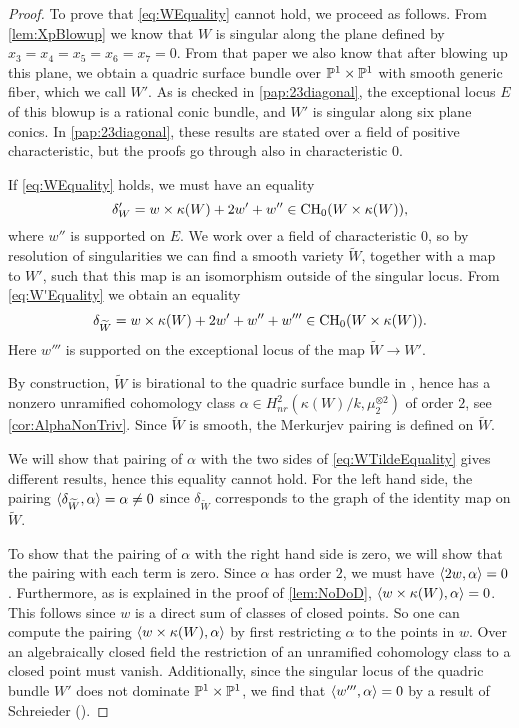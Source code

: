 \begin{proof}
To prove that \eqref{eq:WEquality} cannot hold, we proceed as follows. From \cref{lem:XpBlowup} we know that $W$ is singular along the plane defined by $x_3=x_4=x_5=x_6=x_7=0.$ From that paper we also know that after blowing up this plane, we obtain a quadric surface bundle over $\P^1 \times \P^1$ with smooth generic fiber, which we call $W'$. As is checked in \cref{pap:23diagonal}, the exceptional locus $E$ of this blowup is a rational conic bundle, and $W'$ is singular along six plane conics. In \cref{pap:23diagonal}, these results are stated over a field of positive characteristic, but the proofs go through also in characteristic $0$.

If \eqref{eq:WEquality} holds, we must have an equality 
\begin{equation}
	\label{eq:W'Equality}
	\delta_W' = w \times \kappa(W) + 2w' + w'' \in \CH_0(W \times \kappa(W)),
\end{equation}
where $w''$ is supported on $E$. We work over a field of characteristic $0$, so by resolution of singularities we can find a smooth variety $\widetilde{W}$, together with a map to $W'$, such that this map is an isomorphism outside of the singular locus. From \eqref{eq:W'Equality} we obtain an equality
\begin{equation}
	\label{eq:WTildeEquality}
	\delta_{\widetilde{W}} = w \times \kappa(W) + 2w' + w'' + w''' \in \CH_0(W \times \kappa(W)).
\end{equation}
Here $w'''$ is supported on the exceptional locus of the map $\widetilde{W} \to W'$.

By construction, $\widetilde{W}$ is birational to the quadric surface bundle in \cite{HPTActa}, hence has a nonzero unramified cohomology class $\alpha \in H_{nr}^2(\kappa(W)/k, \mu_2^{\otimes 2})$ of order $2$, see \cref{cor:AlphaNonTriv}. Since $\widetilde{W}$ is smooth, the Merkurjev pairing is defined on $\widetilde{W}$.

We will show that pairing of $\alpha$ with the two sides of \eqref{eq:WTildeEquality} gives different results, hence this equality cannot hold. For the left hand side, the pairing $\ip{\delta_{\widetilde{W}}, \alpha} = \alpha \neq 0$ since $\delta_{\widetilde{W}}$ corresponds to the graph of the identity map on $\widetilde{W}$.

To show that the pairing of $\alpha$ with the right hand side is zero, we will show that the pairing with each term is zero. Since $\alpha$ has order $2$, we must have $\ip{2w, \alpha} = 0$. Furthermore, as is explained in the proof of \cref{lem:NoDoD}, $\ip{w \times \kappa(W), \alpha} = 0$. This follows since $w$ is a direct sum of classes of closed points. So one can compute the pairing $\ip{w \times \kappa(W), \alpha}$ by first restricting $\alpha$ to the points in $w$. Over an algebraically closed field the restriction of an unramified cohomology class to a closed point must vanish. Additionally, since the singular locus of the quadric bundle $W'$ does not dominate $\P^1 \times \P^1$, we find that $\ip{w''', \alpha} = 0$ by a result of Schreieder (\cite[Theorem 10.1]{SchreiederCyclesAndRationality}).


\end{proof}
